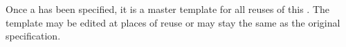 \item[Master Template]{Once a \gdcase has been specified, it is a 
master template for all reuses of this \gdcase{}. The template may 
be edited at places of reuse or may stay the same as the original specification.
}
